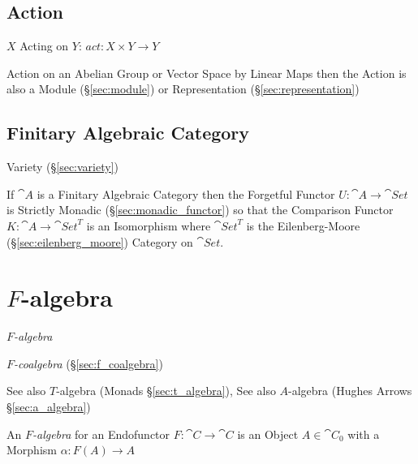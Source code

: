 \subsection{Action}\label{sec:action}


$X$ Acting on $Y$: $act: X \times Y \rightarrow Y$

Action on an Abelian Group or Vector Space by Linear Maps then the
Action is also a Module (\S\ref{sec:module}) or Representation
(\S\ref{sec:representation})



\subsection{Finitary Algebraic Category}
\label{sec:finitary_algebraic_category}

Variety (\S\ref{sec:variety})

If $\cat{A}$ is a Finitary Algebraic Category then the Forgetful
Functor $U : \cat{A} \rightarrow \cat{Set}$ is Strictly Monadic
(\S\ref{sec:monadic_functor}) so that the Comparison Functor $K :
\cat{A} \rightarrow \cat{Set}^T$ is an Isomorphism where
$\cat{Set}^T$ is the Eilenberg-Moore (\S\ref{sec:eilenberg_moore})
Category on $\cat{Set}$.




\section{$F$-algebra}\label{sec:f_algebra}

\emph{$F$-algebra}

\emph{$F$-coalgebra} (\S\ref{sec:f_coalgebra})

See also $T$-algebra (Monads \S\ref{sec:t_algebra}), See also
$A$-algebra (Hughes Arrows \S\ref{sec:a_algebra})

An \emph{$F$-algebra} for an Endofunctor $F : \cat{C} \rightarrow
\cat{C}$ is an Object $A \in \cat{C}_0$ with a Morphism $\alpha : F(A)
\rightarrow A$ \cite{corfield08}

